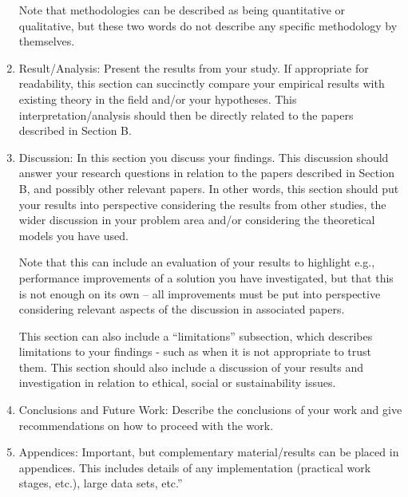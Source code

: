 \documentclass[12pt,openany]{book}
\begin{document}
\begin{enumerate}
     Note that methodologies can be described as being quantitative or qualitative, but these two words do not describe any specific methodology by themselves.
     \item Result/Analysis: Present the results from your study. If appropriate for readability, this section can succinctly compare your empirical results with existing theory in the field and/or your hypotheses. This interpretation/analysis should then be directly related to the papers described in Section B.
     \item Discussion: In this section you discuss your findings. This discussion should answer your research questions in relation to the papers described in Section B, and possibly other relevant papers. In other words, this section should put your results into perspective considering the results from other studies, the wider discussion in your problem area and/or considering the theoretical models you have used.

      Note that this can include an evaluation of your results to highlight e.g., performance improvements of a solution you have investigated, but that this is not enough on its own – all improvements must be put into perspective considering relevant aspects of the discussion in associated papers.

      This section can also include a “limitations” subsection, which describes limitations to your findings - such as when it is not appropriate to trust them. This section should also include a discussion of your results and investigation in relation to ethical, social or sustainability issues.
      \item Conclusions and Future Work: Describe the conclusions of your work and give recommendations on how to proceed with the work.
      \item Appendices: Important, but complementary material/results can be placed in appendices. This includes details of any implementation (practical work stages, etc.), large data sets, etc.”
 \end{enumerate}








% 
\newpage
\footerfont
\printbibliography[heading=bibintoc]



\end{document}
